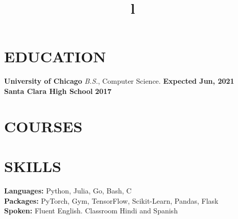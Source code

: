 \documentclass[margin]{res}
\begin{document}
\begin{resume}

\section{EDUCATION}
\textbf{University of Chicago}
{\sl B.S.}, Computer Science. \hfill \textbf{Expected Jun, 2021}\\
\textbf{Santa Clara High School} \hfill \textbf{2017}

\section{COURSES}
\par
{}

\section{SKILLS}
\textbf{Languages:} Python, Julia, Go, Bash, C\\
\textbf{Packages:} PyTorch, Gym, TensorFlow, Scikit-Learn, Pandas, Flask \\
\textbf{Spoken:} Fluent English. Classroom Hindi and Spanish

\begin{format}
\title{l}\\
\\
\body\\
\end{format}

\end{resume}
\end{document}
